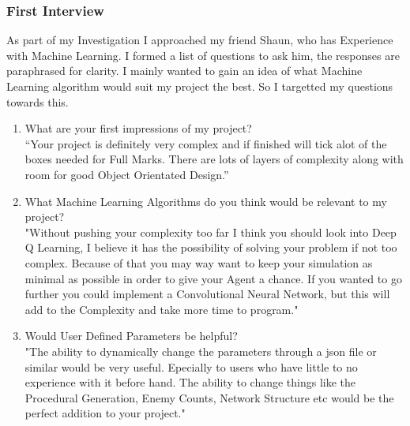 \begin{flushleft}
            \subsubsection{First Interview}
                \large
                As part of my Investigation I approached my friend Shaun, who has Experience with Machine Learning.
                I formed a list of questions to ask him, the responses are paraphrased for clarity. I mainly wanted to gain an idea of 
                what Machine Learning algorithm would suit my project the best. So I targetted my questions towards this. \\
                \vspace{0.2cm}
                \begin{enumerate}
                    \item {\large What are your first impressions of my project?} \\
                    \vspace{0.2cm}
                    “Your project is definitely very complex and if finished will tick alot of the boxes needed for Full Marks. There are lots
                    of layers of complexity along with room for good Object Orientated Design.”

                    \item {\large What Machine Learning Algorithms do you think would be relevant to my project?} \\
                    \vspace{0.2cm}
                    "Without pushing your complexity too far I think you should look into Deep Q Learning, I believe it has the
                    possibility of solving your problem if not too complex. Because of that you may way want to keep your simulation as minimal
                    as possible in order to give your Agent a chance. If you wanted to go further you could implement a Convolutional Neural Network, 
                    but this will add to the Complexity and take more time to program."

                    \item {\large Would User Defined Parameters be helpful?} \\
                    \vspace{0.2cm}
                    "The ability to dynamically change the parameters through a json file or similar would be very useful. Epecially to users who
                    have little to no experience with it before hand. The ability to change things like the Procedural Generation, Enemy Counts, 
                    Network Structure etc would be the perfect addition to your project."


\end{enumerate}
\end{flushleft}
